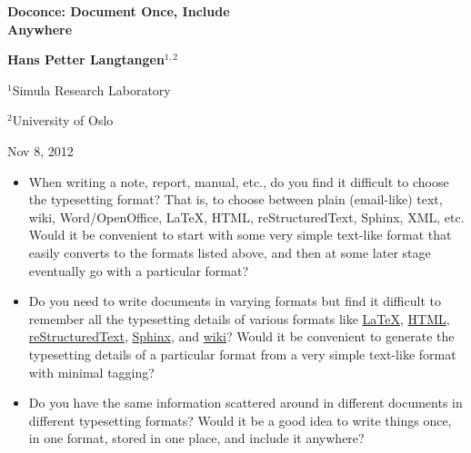 \documentclass[twoside]{article}
\begin{document}





\begin{center}
{\LARGE\bf Doconce: Document Once, Include \\ [1.5mm] Anywhere}
\end{center}





\begin{center}
{\bf Hans Petter Langtangen${}^{1, 2}$} \\ [0mm]
\end{center}

\begin{center}
\centerline{{\small ${}^1$Simula Research Laboratory}}
\centerline{{\small ${}^2$University of Oslo}}
\end{center}





\begin{center}
Nov 8, 2012
\end{center}

\vspace{1cm}



\begin{itemize}
 \item When writing a note, report, manual, etc., do you find it difficult
   to choose the typesetting format? That is, to choose between plain
   (email-like) text, wiki, Word/OpenOffice, {\LaTeX}, HTML,
   reStructuredText, Sphinx, XML, etc.  Would it be convenient to
   start with some very simple text-like format that easily converts
   to the formats listed above, and then at some later stage
   eventually go with a particular format?

 \item Do you need to write documents in varying formats but find it
   difficult to remember all the typesetting details of various
   formats like \href{{http://refcards.com/docs/silvermanj/amslatex/LaTeXRefCard.v2.0.pdf}}{LaTeX}, \href{{http://www.htmlcodetutorial.com/}}{HTML}, \href{{http://docutils.sourceforge.net/docs/ref/rst/restructuredtext.html}}{reStructuredText}, \href{{http://sphinx.pocoo.org/contents.html}}{Sphinx}, and \href{{http://code.google.com/p/support/wiki/WikiSyntax}}{wiki}? Would it be convenient
   to generate the typesetting details of a particular format from a
   very simple text-like format with minimal tagging?

 \item Do you have the same information scattered around in different
   documents in different typesetting formats? Would it be a good idea
   to write things once, in one format, stored in one place, and
   include it anywhere?
\end{itemize}
\end{document}
